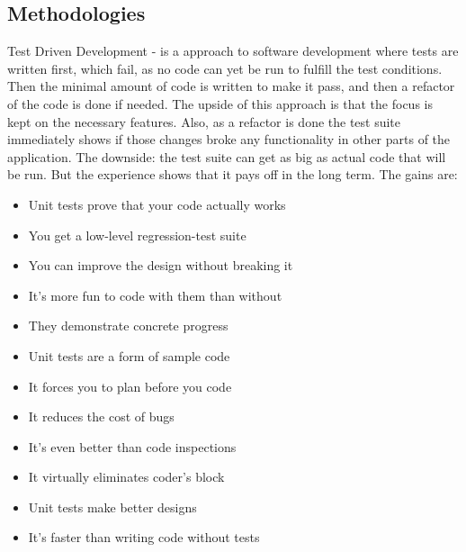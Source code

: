 \subsection{Methodologies}
Test Driven Development - is a approach to software development where tests are
written first, which fail, as no code can yet be run to fulfill the test
conditions. Then the minimal amount of code is written to make it pass, and then
a refactor of the code is done if needed.  The upside of this approach is that
the focus is kept on the necessary features. Also, as a refactor is done the
test suite immediately shows if those changes broke any functionality in other
parts of the application.  The downside: the test suite can get as big as actual
code that will be run. But the experience shows that it pays off in the long
term. The gains are: \citep{twelveBenefitsOfUnitTests}
\begin{itemize}
    \item Unit tests prove that your code actually works
    \item You get a low-level regression-test suite
    \item You can improve the design without breaking it
    \item It's more fun to code with them than without
    \item They demonstrate concrete progress
    \item Unit tests are a form of sample code
    \item It forces you to plan before you code
    \item It reduces the cost of bugs
    \item It's even better than code inspections
    \item It virtually eliminates coder's block
    \item Unit tests make better designs
    \item It's faster than writing code without tests
\end{itemize}

